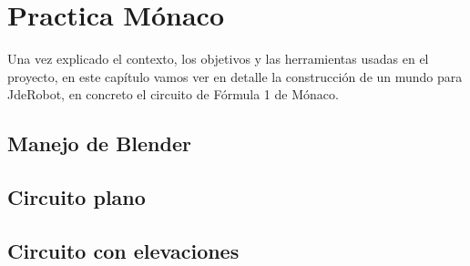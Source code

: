\chapter{Practica Mónaco}
\label{ch:PracticaMonaco}

Una vez explicado el contexto, los objetivos y las herramientas usadas en el proyecto, en este capítulo vamos ver en detalle la construcción de un mundo para JdeRobot, en concreto el circuito de Fórmula 1 de Mónaco.


\section{Manejo de Blender}
\label{sec:pm_manejodeblender}



\section{Circuito plano}
\label{sec:pm_circuitoplano}



\section{Circuito con elevaciones}
\label{sec:pm_circuitoconelevaciones}